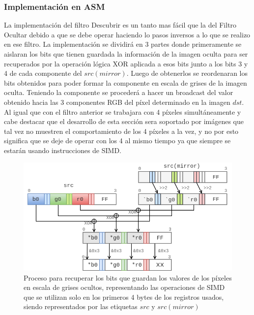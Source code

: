 \documentclass[a4paper]{article}
\begin{document}
\subsubsection{Implementación en ASM}


La implementación del filtro Descubrir es un tanto mas fácil que la del Filtro Ocultar debido a que se debe operar haciendo lo pasos inversos a lo que se realizo en ese filtro. La implementación se dividirá en 3 partes donde primeramente se aislaran los bits que tienen guardada la información de la imagen oculta para ser recuperados por la operación lógica XOR aplicada a esos bits junto a los bits 3 y 4 de cada componente del $src(mirror)$. Luego de obtenerlos se reordenaran los bits obtenidos para poder formar la componente en escala de grises de la imagen oculta. Teniendo la componente se procederá a hacer un broadcast del valor obtenido  hacia las 3 componentes RGB del píxel determinado en la imagen $dst$. Al igual que con el filtro anterior se trabajara con 4 píxeles simultáneamente y cabe destacar que el desarrollo de esta sección sera soportado por imágenes que tal vez no muestren el comportamiento de los 4 píxeles a la vez, y no por esto significa que se deje de operar con los 4 al mismo tiempo ya que siempre se estarán usando instrucciones de SIMD.

\begin{figure}[]
  \begin{center}
	\includegraphics[scale=0.44]{images/filtro-descubrir-1.png}
	\caption{Proceso para recuperar los bits que guardan los valores de los píxeles en escala de grises ocultos, representando las operaciones de SIMD que se utilizan solo en los primeros 4 bytes de los registros usados, siendo representados por las etiquetas $src$ y $src(mirror)$}
	\label{fig:filtro-descubrir-1}
  \end{center}
\end{figure}
\end{document}
